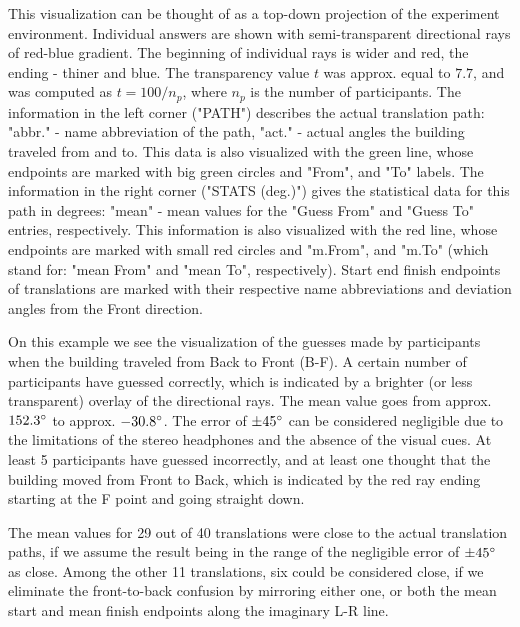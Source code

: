 This visualization can be thought of as a top-down projection of the experiment environment.
Individual answers are shown with semi-transparent directional rays of red-blue gradient. The beginning of individual rays is wider and red, the ending - thiner and blue. The transparency value $t$ was approx. equal to $7.7$, and was computed as $t = 100 / n_{p}$, where $ n_{p} $ is the number of participants.
The information in the left corner ("PATH") describes the actual translation path: "abbr." - name abbreviation of the path, "act." - actual angles the building traveled from and to. This data is also visualized with the green line, whose endpoints are marked with big green circles and "From", and "To" labels.
The information in the right corner ("STATS (deg.)") gives the statistical data for this path in degrees: "mean" - mean values for the "Guess From" and "Guess To" entries, respectively. This information is also visualized with the red line, whose endpoints are marked with small red circles and "m.From", and "m.To" (which stand for: "mean From" and "mean To", respectively).
Start end finish endpoints of translations are marked with their respective name abbreviations and deviation angles from the Front direction.

On this example we see the visualization of the guesses made by participants when the building traveled from Back to Front (B-F). A certain number of participants have guessed correctly, which is indicated by a brighter (or less transparent) overlay of the directional rays. The mean value goes from approx. $152.3\degree$ to approx. $- 30.8\degree$. The error of $\pm 45\degree$ can be considered negligible due to the limitations of the stereo headphones and the absence of the visual cues. At least 5 participants have guessed incorrectly, and at least one thought that the building moved from Front to Back, which is indicated by the red ray ending starting at the F point and going straight down.


The mean values for 29 out of 40 translations were close to the actual translation paths, if we assume the result being in the range of the negligible error of $\pm 45\degree$ as close. %
Among the other 11 translations, six could be considered close, if we eliminate the front-to-back confusion by mirroring either one, or both the mean start and mean finish endpoints along the imaginary L-R line.

